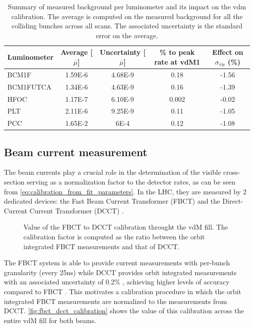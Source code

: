 \begin{table}[!htb]
	\centering
	\caption{Summary of measured background per luminometer and its impact on the vdm calibration. The average is computed on the measured background for all the colliding bunches across all scans. The associated uncertainty is the standard error on the average.}
	\begin{tabular}{lcccc}
		\hline
		Luminometer & Average [$\overline{\mu}$] & Uncertainty [$\overline{\mu}$] & \% to peak rate at vdM1 & Effect on $\sigma_{\mathrm{vis}}$ (\%) \\
		\hline
		BCM1F & 1.59E-6 & 4.68E-9 & 0.18 & -1.56 \\
		BCM1FUTCA & 1.34E-6 & 4.63E-9 & 0.16 & -1.39 \\
		HFOC & 1.17E-7 & 6.10E-9 & 0.002 & -0.02 \\
		PLT & 2.11E-6 & 9.25E-9 & 0.11 & -1.05 \\
		PCC & 1.65E-2 & 6E-4 & 0.12 & -1.08 \\
		\hline
	\end{tabular}
	\label{tab:ss_summary}
\end{table}

\subsection{Beam current measurement}
\label{subsec:beam_current_measurement}

The beam currents play a crucial role in the determination of the visible cross-section serving as a normalization factor to the detector rates, as can be seen from \autoref{eq:calibration_from_fit_parameters}. In the LHC, they are measured by 2 dedicated devices: the Fast Beam Current Transformer (FBCT) \cite{Belohrad:1267400} and the Direct-Current Current Transformer (DCCT) \cite{Odier:1183400}.

\begin{figure}[!htb]
	\centering
	\caption{Value of the FBCT to DCCT calibration throught the vdM fill. The calibration factor is computed as the ratio between the orbit integrated FBCT measurements and that of DCCT.}
	\label{fig:fbct_dcct_calibration}
\end{figure}

The FBCT system is able to provide current measurements with per-bunch granularity (every 25ns) while DCCT provides orbit integrated measurements with an associated uncertainty of 0.2\% \cite{Barschel:2649533}, achieving higher levels of accuracy compared to FBCT \cite{Gras:1379466}. This motivates a calibration procedure in which the orbit integrated FBCT measurements are normalized to the measurements from DCCT. \autoref{fig:fbct_dcct_calibration} shows the value of this calibration across the entire vdM fill for both beams.


